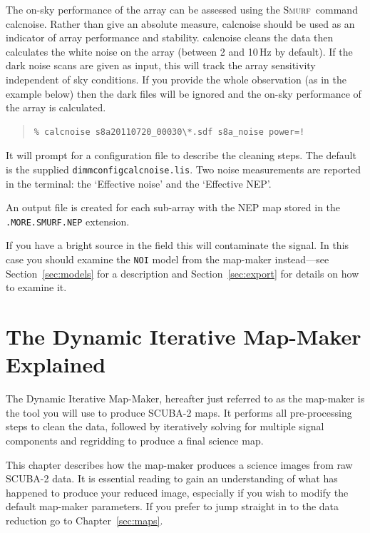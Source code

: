 \documentclass[twoside,11pt]{article}
\newcommand{\htmlref}[2]{#1}
\newcommand{\latexhtml}[2]{#1}
\newcommand{\xref}[3]{#1}
\newcommand{\xlabel}[1]{}
\renewcommand{\_}{\texttt{\symbol{95}}}
\newenvironment{myquote}{
   \color{MidnightBlue}\begin{quote}\begin{small}}{
   \end{small}\end{quote}
}
\newcommand{\smurf}{\xref{\textsc{Smurf}}{sun258}{}}
\newcommand{\task}[1]{\textsf{#1}}
\newcommand{\file}[1]{\texttt{#1}}
\newcommand{\model}[1]{\texttt{#1}}
\newcommand{\calcnoise}{\xref{\task{calcnoise}}{sun258}{CALCNOISE}}
\newcommand{\cref}[3]{\latexhtml{#1~\ref{#2}}{\htmlref{#3}{#2}}}
\renewenvironment{myquote}{
      \begin{quote}\begin{small}}{
      \end{small}\end{quote}
   }
\begin{document}
The on-sky performance of the array can be assessed using the \smurf\
command \calcnoise. Rather than give an absolute measure, \task{calcnoise}
should be used as an indicator of array performance and stability.
\task{calcnoise} cleans the data then calculates the
white noise on the array (between 2 and 10\,Hz by default). If the
dark noise scans are given as input, this will track the array
sensitivity independent of sky conditions. If you provide the whole
observation (as in the example below) then the dark files will be
ignored and the on-sky performance of the array is calculated.

\begin{myquote}
\begin{verbatim}
% calcnoise s8a20110720_00030\*.sdf s8a_noise power=!
\end{verbatim}
\end{myquote}
It will prompt for a configuration file to describe the cleaning
steps. The default is the supplied \file{dimmconfig\_calcnoise.lis}.
Two noise measurements are reported in the terminal: the
`Effective noise' and the `Effective NEP'.

An output file is created for each sub-array with the NEP map stored
in the \texttt{.MORE.SMURF.NEP} extension.

If you have a bright source in the field this will
contaminate the signal. In this case you should examine the
\model{NOI} model from the map-maker instead---see
\cref{Section}{sec:models}{The individual models} for a description
and \cref{Section}{sec:export}{Exporting individual models} for
details on how to examine it.

\clearpage
\section{\xlabel{dimm}The Dynamic Iterative Map-Maker Explained}
\label{sec:dimm}

The Dynamic Iterative Map-Maker, hereafter just referred to as
the map-maker is the tool you will use to produce SCUBA-2 maps. It
performs all pre-processing steps to clean the data, followed by
iteratively solving for multiple signal components and regridding to
produce a final science map.

This chapter describes how the map-maker produces a science images
from raw SCUBA-2 data. It is essential reading to gain an
understanding of what has happened to produce your reduced image,
especially if you wish to modify the default map-maker parameters.
\color{red} If you prefer to jump straight in to the data reduction go
to \cref{Chapter}{sec:maps}{Reducing Your Data}.\color{black}
\end{document}
